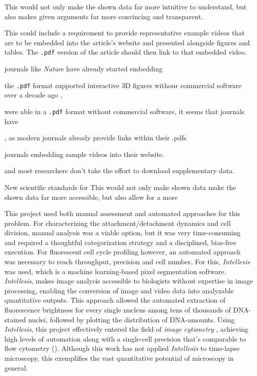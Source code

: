 This would not only
make the shown data far more intuitive to understand, but also makes given
arguments far more convincing and transparent.

This
could include a requirement to provide representative example videos that are to
be embedded into the article's website and presented alongside figures and
tables. The \texttt{.pdf} version of the article should then link to that
embedded video. 

journals like \emph{Nature} have already started embedding

the \texttt{.pdf} format supported interactive 3D figures
withour commercial software over a decade ago \cite{barnesEmbeddingPublishingInteractive2013},



were able in a \texttt{.pdf} format without commercial
software, it seems that journals have 

\cite{barnesEmbeddingPublishingInteractive2013}



, as modern journals already provide links within their .pdfs

journals embedding sample videos into their website. 


and
most researchers don't take the effort to download supplementary data. 


New
scientific standards for 
 This would not only make shown data 
make the shown data far more accessible, but also allow for a more


This
project used both manual assessment and automated approaches for this problem.
For characterizing the attachment/detachment dynamics and cell division, manual
analysis was a viable option, but it was very time-consuming and required a
thoughtful categorization strategy and a disciplined, bias-free execution. For
fluorescent cell cycle profiling however, an automated approach was necessary to
reach throughput, precision and cell number. For this, \textit{Intellesis} was
used, which is a machine learning-based pixel segmentation software.
\textit{Intellesis}, makes image analysis accessible to biologists without
expertise in image processing, enabling the conversion of image and video data
into analyzable quantitative outputs. This approach allowed the automated
extraction of fluorescence brightness for every single nucleus among tens of
thousands of DNA-stained nuclei, followed by plotting the distribution of
DNA-amounts. Using \textit{Intellesis}, this project effectively entered the
field of \emph{image cytometry} \cite{guptaDeepLearningImage2019}, achieving
high levels of automation along with a single-cell precision that's comparable
to flow cytometry (). Although this work has not
applied \textit{Intellesis} to time-lapse microscopy, this exemplifies the vast
quantitative potential of microscopy 
in general.


